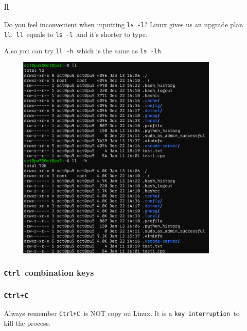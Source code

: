 \documentclass[12pt]{ctexart}
\begin{document}
\subsubsection{\textbf{ll}}

Do you feel inconvenient when inputting \texttt{ls\ -l}? Linux gives us
an upgrade plan \texttt{ll}.\ \texttt{ll}\ equals to \texttt{ls\ -l}\ and
it's shorter to type.

Also you can try \texttt{ll\ -h}\ which is the same as \texttt{ls\ -lh}.

\begin{figure}[H]
    \centering
    \includegraphics[width=0.9\textwidth,keepaspectratio]{assets/Linux/1.7 Tricks for a real Linuxer/5.png}
\end{figure}

\subsubsection{\textbf{\texttt{Ctrl}\ combination
keys}}

\subsubsection*{\textbf{\texttt{Ctrl+C}}}

Always remember \texttt{Ctrl+C}\ is NOT copy on Linux. It is a
\texttt{key\ interruption}\ to kill the process.
\end{document}

